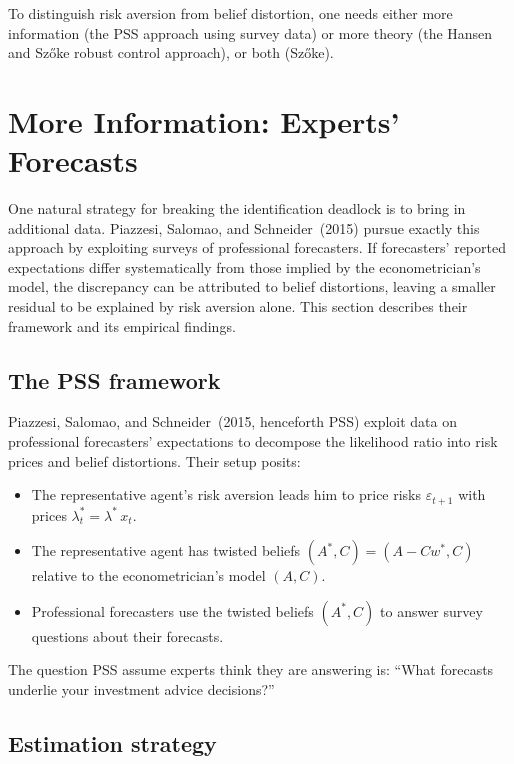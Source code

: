 \documentclass[12pt]{article}
\theoremstyle{definition}
\begin{document}
To distinguish risk aversion from belief distortion, one needs either
more information (the PSS approach using survey data) or more theory
(the Hansen and Sz\H{o}ke robust control approach), or both (Sz\H{o}ke).


\section{More Information: Experts' Forecasts}
\label{sec:PSS}

One natural strategy for breaking the identification deadlock is to
bring in additional data.  Piazzesi, Salomao, and Schneider~(2015)
pursue exactly this approach by exploiting surveys of professional
forecasters.  If forecasters' reported expectations differ
systematically from those implied by the econometrician's model, the
discrepancy can be attributed to belief distortions, leaving a smaller
residual to be explained by risk aversion alone.  This section describes
their framework and its empirical findings.

\subsection{The PSS framework}

Piazzesi, Salomao, and Schneider~(2015, henceforth PSS) exploit data on
professional forecasters' expectations to decompose the likelihood ratio
into risk prices and belief distortions.  Their setup posits:
\begin{itemize}
\item The representative agent's risk aversion leads him to price risks
      $\varepsilon_{t+1}$ with prices $\lambda_t^* = \lambda^*\, x_t$.
\item The representative agent has twisted beliefs
      $(A^*, C) = (A - C w^*, C)$ relative to the econometrician's model
      $(A, C)$.
\item Professional forecasters use the twisted beliefs $(A^*, C)$ to
      answer survey questions about their forecasts.
\end{itemize}

The question PSS assume experts think they are answering is: ``What
forecasts underlie your investment advice decisions?''

\subsection{Estimation strategy}
\end{document}
